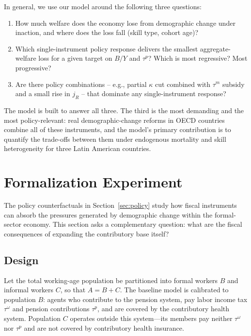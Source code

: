 \documentclass[12pt,a4paper]{article}
\begin{document}
\par In general, we use our model around the following three questions:
\begin{enumerate}
\item How much welfare does the economy lose from demographic change under inaction, and where does the loss fall (skill type, cohort age)?
\item Which single-instrument policy response delivers the smallest aggregate-welfare loss for a given target on $B/Y$ and $\tau^p$? Which is most regressive? Most progressive?
\item Are there policy combinations -- e.g., partial $\kappa$ cut combined with $\tau^m$ subsidy and a small rise in $j_R$ -- that dominate any single-instrument response?
\end{enumerate}
The model is built to answer all three. The third is the most demanding and the most policy-relevant: real demographic-change reforms in OECD countries combine all of these instruments, and the model's primary contribution is to quantify the trade-offs between them under endogenous mortality and skill heterogeneity for three Latin American countries.


\section{Formalization Experiment}
\label{sec:formalization}

The policy counterfactuals in Section~\ref{sec:policy} study how fiscal instruments can absorb the pressures generated by demographic change within the formal-sector economy. This section asks a complementary question: what are the fiscal consequences of expanding the contributory base itself?

\subsection{Design}
\label{subsec:form_design}

Let the total working-age population be partitioned into formal workers $B$ and informal workers $C$, so that $A = B + C$. The baseline model is calibrated to population $B$: agents who contribute to the pension system, pay labor income tax $\tau^\omega$ and pension contributions $\tau^p$, and are covered by the contributory health system. Population $C$ operates outside this system---its members pay neither $\tau^\omega$ nor $\tau^p$ and are not covered by contributory health insurance.
\end{document}
